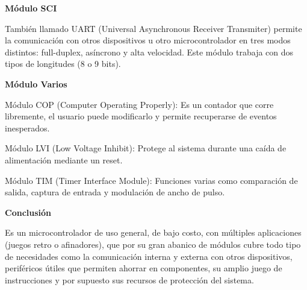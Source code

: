 \documentclass[12pt]{article}
\begin{document}
{\large{\textbf{Módulo SCI}}}

También llamado UART (Universal Asynchronous Receiver Transmiter) permite la comunicación con otros dispositivos u otro microcontrolador en tres modos distintos: full-duplex, asíncrono y alta velocidad. Este módulo trabaja con dos tipos de longitudes (8 o 9 bits).

{\large{\textbf{Módulo Varios}}}

Módulo COP (Computer Operating Properly): Es un contador que corre libremente, el usuario puede modificarlo y permite recuperarse de eventos inesperados.

Módulo LVI (Low Voltage Inhibit): Protege al sistema durante una caída de alimentación mediante un reset.

Módulo TIM (Timer Interface Module): Funciones varias como comparación de salida, captura de entrada y modulación de ancho de pulso.


{\large{\textbf{Conclusión}}}

Es un microcontrolador de uso general, de bajo costo, con múltiples aplicaciones (juegos retro o afinadores), que por su gran abanico de módulos cubre todo tipo de necesidades como la comunicación interna y externa con otros dispositivos, periféricos útiles que permiten ahorrar en componentes, su amplio juego de instrucciones y por supuesto sus recursos de protección del sistema.
\end{document}
